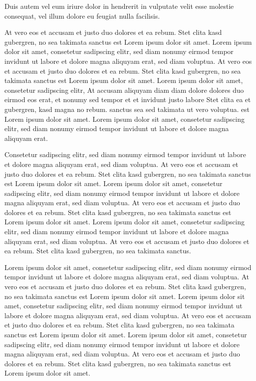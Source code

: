 Duis autem vel eum iriure dolor in hendrerit in vulputate velit esse molestie
consequat, vel illum dolore eu feugiat nulla facilisis.

At vero eos et accusam et justo duo dolores et ea rebum. Stet clita kasd
gubergren, no sea takimata sanctus est Lorem ipsum dolor sit amet. Lorem ipsum
dolor sit amet, consetetur sadipscing elitr, sed diam nonumy eirmod tempor
invidunt ut labore et dolore magna aliquyam erat, sed diam voluptua. At vero eos
et accusam et justo duo dolores et ea rebum. Stet clita kasd gubergren, no sea
takimata sanctus est Lorem ipsum dolor sit amet. Lorem ipsum dolor sit amet,
consetetur sadipscing elitr, At accusam aliquyam diam diam dolore dolores duo
eirmod eos erat, et nonumy sed tempor et et invidunt justo labore Stet clita ea
et gubergren, kasd magna no rebum. sanctus sea sed takimata ut vero voluptua.
est Lorem ipsum dolor sit amet. Lorem ipsum dolor sit amet, consetetur
sadipscing elitr, sed diam nonumy eirmod tempor invidunt ut labore et dolore
magna aliquyam erat.

Consetetur sadipscing elitr, sed diam nonumy eirmod tempor invidunt ut labore et
dolore magna aliquyam erat, sed diam voluptua. At vero eos et accusam et justo
duo dolores et ea rebum. Stet clita kasd gubergren, no sea takimata sanctus est
Lorem ipsum dolor sit amet. Lorem ipsum dolor sit amet, consetetur sadipscing
elitr, sed diam nonumy eirmod tempor invidunt ut labore et dolore magna aliquyam
erat, sed diam voluptua. At vero eos et accusam et justo duo dolores et ea
rebum. Stet clita kasd gubergren, no sea takimata sanctus est Lorem ipsum dolor
sit amet. Lorem ipsum dolor sit amet, consetetur sadipscing elitr, sed diam
nonumy eirmod tempor invidunt ut labore et dolore magna aliquyam erat, sed diam
voluptua. At vero eos et accusam et justo duo dolores et ea rebum. Stet clita
kasd gubergren, no sea takimata sanctus.

Lorem ipsum dolor sit amet, consetetur sadipscing elitr, sed diam nonumy eirmod
tempor invidunt ut labore et dolore magna aliquyam erat, sed diam voluptua. At
vero eos et accusam et justo duo dolores et ea rebum. Stet clita kasd gubergren,
no sea takimata sanctus est Lorem ipsum dolor sit amet. Lorem ipsum dolor sit
amet, consetetur sadipscing elitr, sed diam nonumy eirmod tempor invidunt ut
labore et dolore magna aliquyam erat, sed diam voluptua. At vero eos et accusam
et justo duo dolores et ea rebum. Stet clita kasd gubergren, no sea takimata
sanctus est Lorem ipsum dolor sit amet. Lorem ipsum dolor sit amet, consetetur
sadipscing elitr, sed diam nonumy eirmod tempor invidunt ut labore et dolore
magna aliquyam erat, sed diam voluptua. At vero eos et accusam et justo duo
dolores et ea rebum. Stet clita kasd gubergren, no sea takimata sanctus est
Lorem ipsum dolor sit amet.

